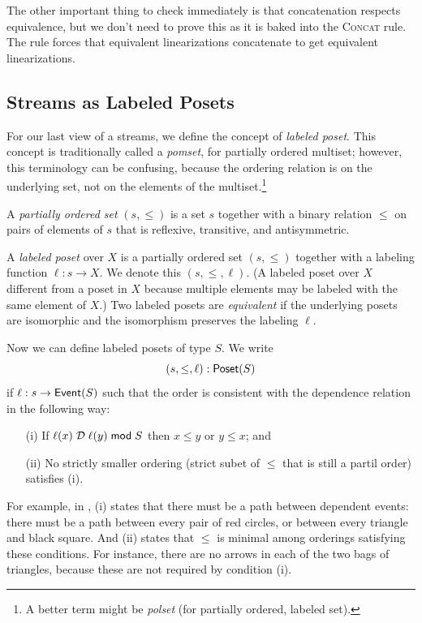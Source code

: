 The other important thing to check immediately is that concatenation respects equivalence, but we don't need to prove this as it is baked into the \textsc{Concat} rule. The rule forces that equivalent linearizations concatenate to get equivalent linearizations.

\subsection{Streams as Labeled Posets}
\label{view:labeled-posets}

For our last view of a streams, we define the concept of \emph{labeled poset}. This concept is traditionally called a \emph{pomset}, for partially ordered multiset; however, this terminology can be confusing, because the ordering relation is on the underlying set, not on the elements of the multiset.\footnote{
  A better term might be \emph{polset} (for partially ordered, labeled set).
}

A \emph{partially ordered set} $(s, \le)$ is a set $s$ together with a binary relation $\le$ on pairs of elements of $s$ that is reflexive, transitive, and antisymmetric.

A \emph{labeled poset} over $X$ is a
partially ordered set $(s, \le)$ together with a labeling function $\ell: s \to X$.
We denote this $(s, \le, \ell)$. (A labeled poset over $X$ different from a poset in $X$ because multiple elements may be labeled with the same element of $X$.)
Two labeled posets are \emph{equivalent} if the underlying posets are isomorphic and the isomorphism preserves the labeling $\ell$.

Now we can define labeled posets of type $S$.
We write
\[
(s, \le, \ell): \mathsf{Poset}({S})
\]
if $\ell: s \to \mathsf{Event}(S)$ such that the order is consistent with the dependence
relation in the following way:
\begin{enumerate}
\item[(i)] If $\ell(x) \;\mathcal{D}\; \ell(y) \;\mathsf{mod}\; {S}$ then $x \le y$ or $y \le x$; and
\item[(ii)] No strictly smaller ordering (strict subet of $\le$ that is still a partil order) satisfies (i).
\end{enumerate}

For example, in , (i) states that there must be a path between dependent events: there must be a path between every pair of red circles, or between every triangle and black square.
And (ii) states that $\le$ is minimal among orderings satisfying these conditions.
For instance, there are no arrows in each of the two bags of triangles, because these are not required by condition (i).

